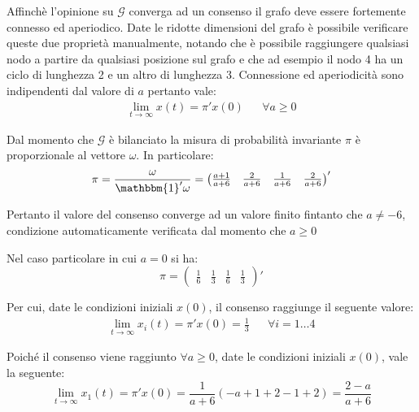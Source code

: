 \documentclass[11pt,largemargins]{homework}
\begin{document}
\begin{alphaparts}

    \questionpart
    Affinchè l'opinione su \(\mathcal{G}\) converga ad un consenso il grafo deve essere fortemente connesso ed aperiodico. Date le ridotte dimensioni del grafo è possibile verificare queste due proprietà manualmente, notando che è possibile raggiungere qualsiasi nodo a partire da qualsiasi posizione sul grafo e che ad esempio il nodo 4 ha un ciclo di lunghezza 2 e un altro di lunghezza 3. Connessione ed aperiodicità sono indipendenti dal valore di \(a\) pertanto vale:
    \begin{align*}
      \lim\limits_{t \rightarrow \infty} x(t)=\pi ' x(0) && \forall a\geq 0
    \end{align*}

    Dal momento che \(\mathcal{G}\) è bilanciato la misura di probabilità invariante \(\pi \) è proporzionale al vettore \(\omega\). In particolare:
    \begin{equation*}
      \pi = \frac{\omega}{\mathbbm{1}'\omega}=\begin{pmatrix}
        \frac{a+1}{a+6} & \frac{2}{a+6} & \frac{1}{a+6} & \frac{2}{a+6}
      \end{pmatrix}'
    \end{equation*}

    Pertanto il valore del consenso converge ad un valore finito fintanto che \(a \neq -6\), condizione automaticamente verificata dal momento che \(a \geq 0\)
    \questionpart

    Nel caso particolare in cui \(a=0\) si ha:
    \begin{equation*}
      \pi = \begin{pmatrix}
        \frac{1}{6} & \frac{1}{3} & \frac{1}{6} & \frac{1}{3}
      \end{pmatrix}'
    \end{equation*} 

    Per cui, date le condizioni iniziali \(x(0)\), il consenso raggiunge il seguente valore: 
    \begin{align*}
      \lim\limits_{t \rightarrow \infty} x_i(t)=\pi ' x(0) = \frac{1}{3} && \forall i = 1 \dots 4
    \end{align*}

    \questionpart
    Poiché il consenso viene raggiunto \(\forall a \geq 0 \), date le condizioni iniziali \(x(0)\), vale la seguente:
    \begin{equation*}
      \lim\limits_{t \rightarrow \infty} x_1(t)=\pi ' x(0) = \frac{1}{a+6}(-a+1+2-1+2) = \frac{2-a}{a+6}
    \end{equation*}


\end{alphaparts}
\end{document}

